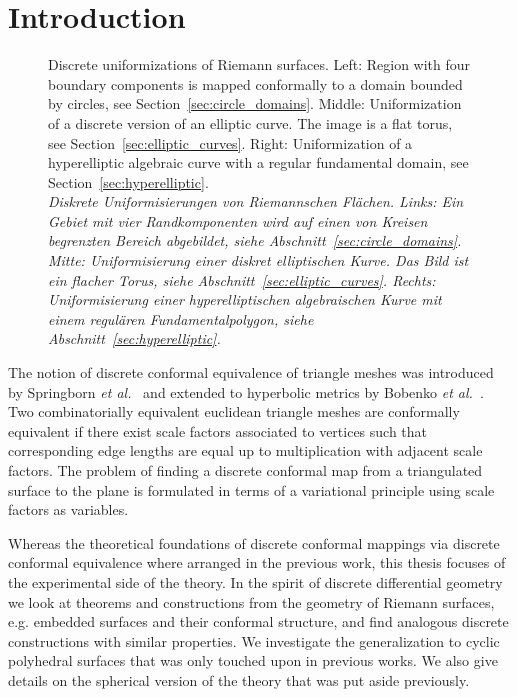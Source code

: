 \documentclass[Thesis.tex]{subfiles}
\begin{document}
\chapter{Introduction}

\begin{figure}
\centering
{}
\caption{
Discrete uniformizations of Riemann surfaces. 
Left: Region with four boundary components is mapped conformally to a domain bounded by circles, see Section~\ref{sec:circle_domains}. 
Middle: Uniformization of a discrete version of an elliptic curve. The image is a flat torus, see Section~\ref{sec:elliptic_curves}. 
Right: Uniformization of a hyperelliptic algebraic curve with a regular fundamental domain, see Section~\ref{sec:hyperelliptic}.\\
\it Diskrete Uniformisierungen von Riemannschen Fl\"{a}chen. 
Links: Ein Gebiet mit vier Randkomponenten wird auf einen von Kreisen begrenzten Bereich abgebildet, siehe Abschnitt~\ref{sec:circle_domains}.
Mitte: Uniformisierung einer diskret elliptischen Kurve. Das Bild ist ein flacher Torus, siehe Abschnitt~\ref{sec:elliptic_curves}.
Rechts: Uniformisierung einer hyperelliptischen algebraischen Kurve mit einem regul\"{a}ren Fundamentalpolygon, siehe Abschnitt~\ref{sec:hyperelliptic}.
}
\label{fig:intro_uniformizations} 
\end{figure}

The notion of discrete conformal equivalence of triangle meshes was introduced by Springborn {\it et al.}~\cite{Springborn2008} and extended to hyperbolic metrics by Bobenko {\it et al.}~\cite{BPS2015:dconf}. 
Two combinatorially equivalent euclidean triangle meshes are conformally equivalent if there exist scale factors associated to vertices such that corresponding edge lengths are equal up to multiplication with adjacent scale factors.
The problem of finding a discrete conformal map from a triangulated surface to the plane is formulated in terms of a variational principle using scale factors as variables.

Whereas the theoretical foundations of discrete conformal mappings via discrete conformal equivalence where arranged in the previous work, this thesis focuses of the experimental side of the theory. 
In the spirit of discrete differential geometry we look at theorems and constructions from the geometry of Riemann surfaces, e.g. embedded surfaces and their conformal structure, and find analogous discrete constructions with similar properties.
We investigate the generalization to cyclic polyhedral surfaces that was only touched upon in previous works.
We also give details on the spherical version of the theory that was put aside previously.
\end{document}
